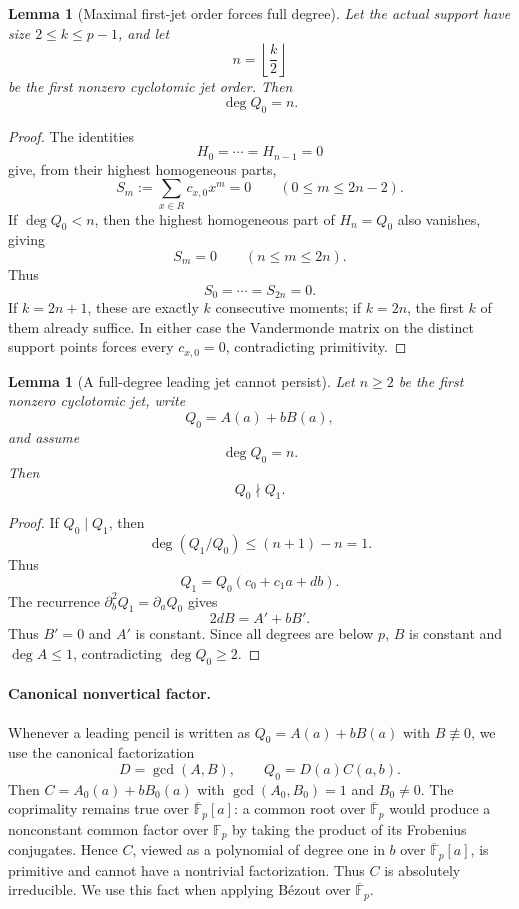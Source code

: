 \documentclass[11pt]{article}
\newtheorem{lemma}[theorem]{Lemma}
\newcommand{\F}{\mathbb F}
\begin{document}
\begin{lemma}[Maximal first-jet order forces full degree]
\label{lem:maximal-order-full-degree}
Let the actual support have size $2\le k\le p-1$, and let
\[
 n=\left\lfloor\frac{k}{2}\right\rfloor
\]
be the first nonzero cyclotomic jet order.  Then
\begin{equation}
 \boxed{\deg Q_0=n.}
 \label{eq:maximal-order-full-degree}
\end{equation}
\end{lemma}

\begin{proof}
The identities
\[
 H_0=\cdots=H_{n-1}=0
\]
give, from their highest homogeneous parts,
\[
 S_m:=\sum_{x\in R}c_{x,0}x^m=0
 \qquad(0\le m\le2n-2).
\]
If \(\deg Q_0<n\), then the highest homogeneous part of
\(H_n=Q_0\) also vanishes, giving
\[
 S_m=0
 \qquad(n\le m\le2n).
\]
Thus
\[
 S_0=\cdots=S_{2n}=0.
\]
If \(k=2n+1\), these are exactly \(k\) consecutive moments; if
\(k=2n\), the first \(k\) of them already suffice.  In either case
the Vandermonde matrix on the distinct support points forces every
\(c_{x,0}=0\), contradicting primitivity.
\end{proof}

\begin{lemma}[A full-degree leading jet cannot persist]
\label{lem:Q0-not-divide-Q1-universal}
Let \(n\ge2\) be the first nonzero cyclotomic jet, write
\[
 Q_0=A(a)+bB(a),
\]
and assume
\[
 \deg Q_0=n.
\]
Then
\begin{equation}
 \boxed{Q_0\nmid Q_1.}
 \label{eq:Q0-no-wholesale-persistence}
\end{equation}
\end{lemma}

\begin{proof}
If \(Q_0\mid Q_1\), then
\[
 \deg(Q_1/Q_0)\le(n+1)-n=1.
\]
Thus
\[
 Q_1=Q_0(c_0+c_1a+db).
\]
The recurrence \(\partial_b^2Q_1=\partial_aQ_0\) gives
\[
 2dB=A'+bB'.
\]
Thus $B'=0$ and $A'$ is constant.  Since all degrees are below $p$, $B$ is constant and $\deg A\le1$, contradicting $\deg Q_0\ge2$.
\end{proof}


\paragraph{Canonical nonvertical factor.}
Whenever a leading pencil is written as \(Q_0=A(a)+bB(a)\) with
\(B\not\equiv0\), we use the canonical factorization
\[
 D=\gcd(A,B),
 \qquad
 Q_0=D(a)C(a,b).
\]
Then \(C=A_0(a)+bB_0(a)\) with \(\gcd(A_0,B_0)=1\) and
\(B_0\ne0\).  The coprimality remains true over
\(\overline{\F}_p[a]\): a common root over \(\overline{\F}_p\) would
produce a nonconstant common factor over \(\F_p\) by taking the product of
its Frobenius conjugates.  Hence \(C\), viewed as a polynomial of degree one
in \(b\) over \(\overline{\F}_p[a]\), is primitive and cannot have a
nontrivial factorization.  Thus \(C\) is absolutely irreducible.  We use
this fact when applying B\'ezout over \(\overline{\F}_p\).
\end{document}
